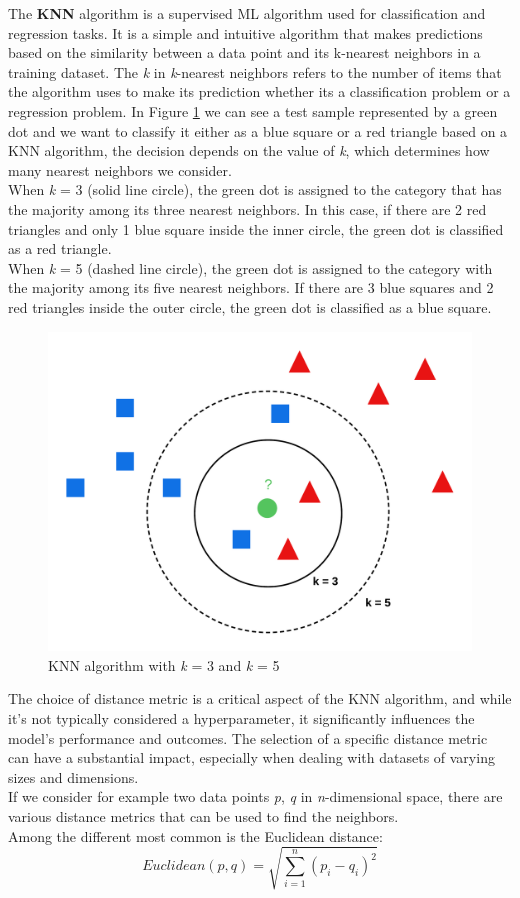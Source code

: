 The \textbf{KNN} algorithm is a supervised ML algorithm used for classification and regression tasks.
It is a simple and intuitive algorithm that makes predictions based on the similarity between a data point and its k-nearest neighbors in a training dataset.
The \textit{k} in \textit{k}-nearest neighbors refers to the number of items that the algorithm uses to make its prediction whether its a classification problem or a regression problem.
In Figure \ref{fig:knn} we can see a test sample represented by a green dot and we want to classify 
it either as a blue square or a red triangle based on a KNN algorithm, the decision depends on the value of \textit{k}, which determines how many nearest neighbors we consider.\\
When \textit{k} = 3 (solid line circle), the green dot is assigned to the category that has the majority among its three nearest neighbors. 
In this case, if there are 2 red triangles and only 1 blue square inside the inner circle, the green dot is classified as a red triangle. \\
When \textit{k} = 5 (dashed line circle), the green dot is assigned to the category with the majority among its five nearest neighbors. 
If there are 3 blue squares and 2 red triangles inside the outer circle, the green dot is classified as a blue square.
\begin{figure}[H]
    \centering
    \includegraphics[width=0.55\linewidth]{graphics/KNeighbours.png}
    \caption{KNN algorithm with \textit{k} = 3 and \textit{k} = 5}
    \label{fig:knn}
\end{figure}

The choice of distance metric is a critical aspect of the KNN algorithm, and while it's not typically considered a hyperparameter, it significantly influences the model's performance and outcomes. 
The selection of a specific distance metric can have a substantial impact, especially when dealing with datasets of varying sizes and dimensions. \\
If we consider for example two data points \textit{p}, \textit{q} in \textit{n}-dimensional space, there are various distance metrics that can be used to find the neighbors.\\
Among the different  most common is the Euclidean distance: 
\begin{equation}
    Euclidean(p,q) = \sqrt{\sum_{i=1}^{n} (p_i - q_i)^2}
    \label{formula:distance}
\end{equation}

